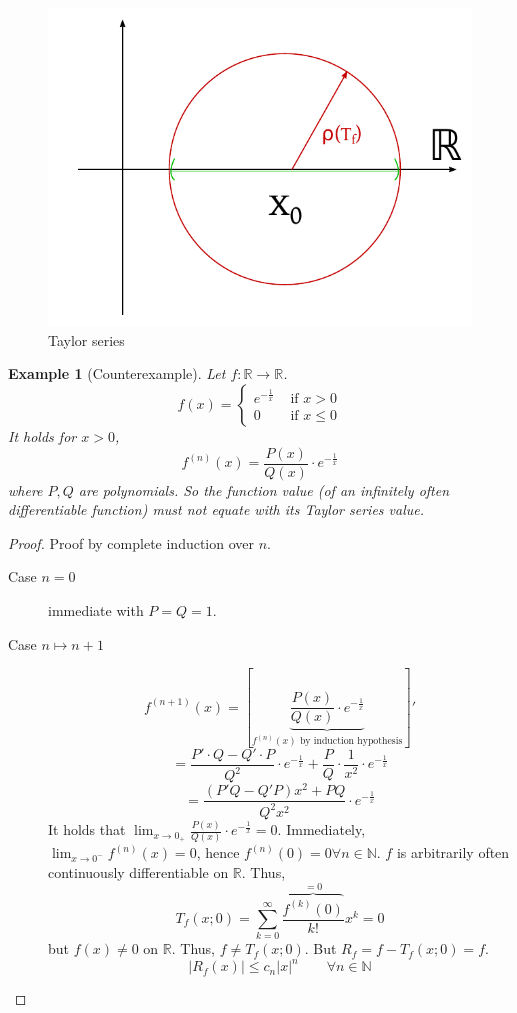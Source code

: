 \documentclass{article}
\newtheorem{example}{Example}  \numberwithin{example}{section}
\newcommand{\card}[1]{\left|#1\right|}
\begin{document}
\begin{figure}[t]
  \begin{center}
    \includegraphics{img/28_Taylor_series.pdf}
    \caption{Taylor series}
    \label{img:tay}
  \end{center}
\end{figure}

\begin{example}[Counterexample]
  Let $f: \mathbb R \to \mathbb R$.
  \[ f(x) = \begin{cases} e^{-\frac1x} & \text{ if } x > 0 \\ 0 & \text{ if } x \leq 0 \end{cases} \]
  It holds for $x > 0$,
  \[ f^{(n)}(x) = \frac{P(x)}{Q(x)} \cdot e^{-\frac1x} \]
  where $P, Q$ are polynomials.
  So the function value (of an infinitely often differentiable function) must not equate with its Taylor series value.
\end{example}

\begin{proof}
  Proof by complete induction over $n$.

  \begin{description}
    \item[Case $n=0$] immediate with $P = Q = 1$.
    \item[Case $n\mapsto n+1$]
      \[ f^{(n+1)}(x) = \left[\underbrace{\frac{P(x)}{Q(x)} \cdot e^{-\frac1x}}_{f^{(n)}(x) \text{ by induction hypothesis}}\right]' \]
      \[ = \frac{P' \cdot Q - Q' \cdot P}{Q^2} \cdot e^{-\frac1x} + \frac PQ \cdot \frac1{x^2} \cdot e^{-\frac1x} \]
      \[ = \frac{(P' Q - Q' P) x^2 + PQ}{Q^2 x^2} \cdot e^{-\frac1x} \]
      It holds that $\lim_{x\to0_+} \frac{P(x)}{Q(x)} \cdot e^{-\frac1x} = 0$.
      Immediately, $\lim_{x \to 0^-} f^{(n)}(x) = 0$, hence $f^{(n)}(0) = 0 \forall n \in \mathbb N$.
      $f$ is arbitrarily often continuously differentiable on $\mathbb R$. Thus,
      \[ T_f(x; 0) = \sum_{k=0}^\infty \frac{\overbrace{f^{(k)}(0)}^{=0}}{k!} x^k = 0 \]
      but $f(x) \neq 0$ on $\mathbb R$. Thus, $f \neq T_f(x; 0)$.
      But $R_f = f - T_f(x; 0) = f$.
      \[ \card{R_f(x)} \leq c_n \card{x}^n \qquad \forall n \in \mathbb N \]
  \end{description}
\end{proof}
\end{document}
